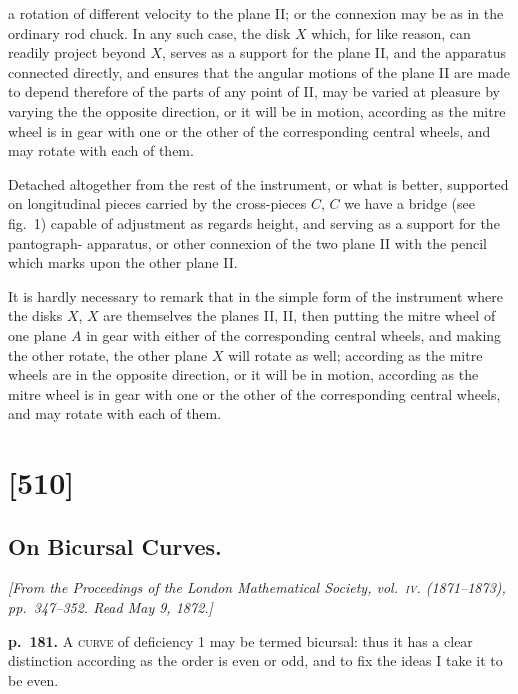 \documentclass[11pt,a4paper]{book}
\begin{document}
a rotation of different velocity to the plane II; or the connexion may be as in the
ordinary rod chuck. In any such case, the disk $X$ which, for like reason, can readily
project beyond $X$, serves as a support for the plane II, and the apparatus connected directly, and ensures that the angular motions of the plane II are made to depend
therefore of the parts of any point of II, may be varied at pleasure by varying the
the opposite direction, or it will be in motion, according as the mitre wheel is in
gear with one or the other of the corresponding central wheels, and may rotate
with each of them.

Detached altogether from the rest of the instrument, or what is better, supported
on longitudinal pieces carried by the cross-pieces $C$, $C$ we have a bridge (see fig.\ 1)
capable of adjustment as regards height, and serving as a support for the pantograph-
apparatus, or other connexion of the two plane II with the pencil which marks upon
the other plane II.

It is hardly necessary to remark that in the simple form of the instrument where
the disks $X$, $X$ are themselves the planes II, II, then putting the mitre wheel of one
plane $A$ in gear with either of the corresponding central wheels, and making the other
rotate, the other plane $X$ will rotate as well; according as the mitre wheels are in
the opposite direction, or it will be in motion, according as the mitre wheel is in
gear with one or the other of the corresponding central wheels, and may rotate
with each of them.

\clearpage

\section{[510]}
\subsection{On Bicursal Curves.}

\begin{center}
\textit{[From the Proceedings of the London Mathematical Society, vol.\ \textsc{iv}. (1871--1873),
pp.\ 347--352.  Read May 9, 1872.]}
\end{center}

\noindent
\textbf{p.~181.}  \textsc{A curve} of deficiency 1 may be termed bicursal: thus it has a clear distinction
according as the order is even or odd, and to fix the ideas I take it to be even.
\end{document}

